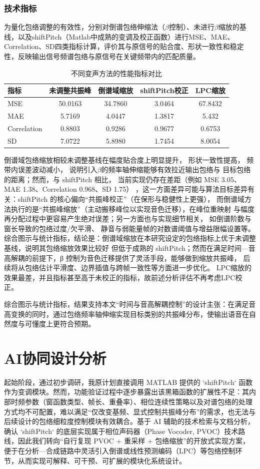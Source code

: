 \documentclass[12pt,a4paper]{article}
\begin{document}
\subsubsection{技术指标}
为量化包络调整的有效性，分别对倒谱包络伸缩法（$\beta$控制）、未进行$\beta$缩放的基线，以及shiftPitch（Matlab中成熟的变调及校正函数）进行MSE、MAE、Correlation、SD四类指标计算，评价其与原信号的贴合度、形状一致性和稳定性，反映输出信号频谱包络与原信号在关键频带内的匹配质量。

\begin{table}[htbp]
  \centering
  \caption{不同变声方法的性能指标对比}
  \label{table:voice_performance}
  \begin{tabular}{lcccc}
    \toprule
    指标 &  未调整共振峰 & 倒谱域缩放 &shiftPitch校正 &LPC缩放\\
    \midrule
    MSE   & 50.0163 & 34.7860 & 3.0464 & 67.8432\\
    MAE   &  5.7169  & 4.0447  & 1.3817 & 5.432\\
    Correlation &  0.8803 & 0.9286 & 0.9677 & 0.6753\\
    SD    &  7.0722  & 5.8980  &1.7454& 8.0054\\
    \bottomrule
  \end{tabular}
\end{table}
倒谱域包络缩放相较未调整基线在幅度贴合度上明显提升，
形状一致性提高，
频带内误差波动减小，
说明引入$\beta$的频率轴伸缩能够有效拉近输出包络与
目标包络的距离；然而，与 shiftPitch 相比，
当前实现仍存在差距（例如 MSE 3.05、MAE 1.38、Correlation 0.968、SD 1.75）
，这一方面差异可能与算法目标差异有关：shiftPitch 的核心偏向“共振峰校正”（在保形与稳健性上更强），
而倒谱域方法执行的是“共振峰缩放”（主动搬移峰位以实现音色迁移），在峰位重映射
与幅度再分配过程中更容易产生绝对误差；另一方面也与实现细节相关，
如倒谱阶数与窗长导致的包络过度/欠平滑、
静音与弱能量帧的对数谱阈值与增益限幅设置等。
综合图示与统计指标，结论是：倒谱域缩放在本研究设定的包络指标上优于未调整基线，说明其包络缩放效果比较好
但低于成熟的 shiftPitch；然而在满足时间—音高解耦的前提下，β 控制为音色迁移提供了灵活手段，能够做到缩放共振峰，
后续将从包络估计平滑度、边界插值与跨帧一致性等方面进一步优化。
LPC缩放的效果最差，并且指标甚至高于未校正的指标，故前述分析评估不再考虑LPC校正。


综合图示与统计指标，结果支持本文“时间与音高解耦控制”的设计主张：在满足音高变换的同时，通过包络频率轴伸缩实现目标类别的共振峰分布，使输出语音在自然度与可懂度上更符合预期。

\newpage
\section{AI协同设计分析}
起始阶段，通过初步调研，我原计划直接调用 MATLAB 提供的 `shiftPitch` 函数作为变调模块。然而，功能验证过程中逐步暴露出该黑箱函数的扩展性不足：其内部时频参数（窗函数类型、帧长、重叠率）、相位连续性策略以及对谱包络的处理方式均不可配置，难以满足“仅改变基频、显式控制共振峰分布”的需求，也无法与后续设计的包络细粒度控制模块有效耦合。基于 AI 辅助的技术检索与文档分析，确认 `shiftPitch` 的底层实现属于相位声码器（Phase Vocoder, PVOC）技术路线，因此我们转向“自行复现 PVOC + 重采样 + 包络缩放”的开放式实现方案，便于在分析—合成链路中灵活引入倒谱或线性预测编码（LPC）等包络控制环节，从而实现可解释、可干预、可扩展的模块化系统设计。
\end{document}
